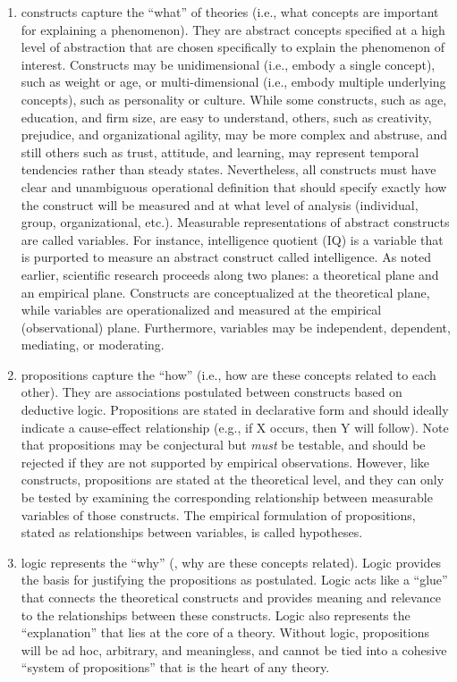 \begin{enumerate}
	\item \Glspl{construct} capture the ``what'' of theories (i.e., what concepts are important for explaining a phenomenon). They are abstract concepts specified at a high level of abstraction that are chosen specifically to explain the phenomenon of interest. Constructs may be unidimensional (i.e., embody a single concept), such as weight or age, or multi-dimensional (i.e., embody multiple underlying concepts), such as personality or culture. While some constructs, such as age, education, and firm size, are easy to understand, others, such as creativity, prejudice, and organizational agility, may be more complex and abstruse, and still others such as trust, attitude, and learning, may represent temporal tendencies rather than steady states. Nevertheless, all constructs must have clear and unambiguous operational definition that should specify exactly how the construct will be measured and at what level of analysis (individual, group, organizational, etc.). Measurable representations of abstract constructs are called variables. For instance, intelligence quotient (IQ) is a variable that is purported to measure an abstract construct called intelligence. As noted earlier, scientific research proceeds along two planes: a theoretical plane and an empirical plane. Constructs are conceptualized at the theoretical plane, while variables are operationalized and measured at the empirical (observational) plane. Furthermore, variables may be independent, dependent, mediating, or moderating.

	\item \Glspl{proposition} capture the ``how'' (i.e., how are these concepts related to each other). They are associations postulated between constructs based on deductive logic. Propositions are stated in declarative form and should ideally indicate a cause-effect relationship (e.g., if X occurs, then Y will follow). Note that propositions may be conjectural  but \textit{must} be testable, and should be rejected if they are not supported by empirical observations. However, like constructs, propositions are stated at the theoretical level, and they can only be tested by examining the corresponding relationship between measurable variables of those constructs. The empirical formulation of propositions, stated as relationships between variables, is called hypotheses.

	\item \Gls{logic} represents the ``why'' (\ie, why are these concepts related). Logic provides the basis for justifying the propositions as postulated. Logic acts like a ``glue'' that connects the theoretical constructs and provides meaning and relevance to the relationships between these constructs. Logic also represents the ``explanation'' that lies at the core of a theory. Without logic, propositions will be ad hoc, arbitrary, and meaningless, and cannot be tied into a cohesive ``system of propositions'' that is the heart of any theory.


\end{enumerate}
